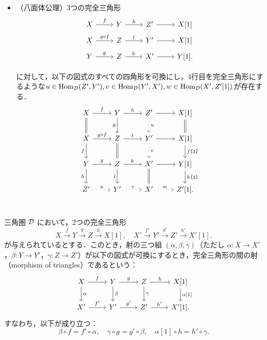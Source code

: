 \begin{defn}
\begin{itemize}
	\item[(TR6)]
		（八面体公理）3つの完全三角形
			\[
				\begin{tikzcd}[row sep=5pt]
			X \ar[r,"f"]& Y\ar[r,"h"]& Z' \ar[r]& X[1]\\
			X \ar[r,"g\circ f"]& Z\ar[r,"l"]& Y' \ar[r]& X[1]\\
			Y \ar[r,"g"]& Z\ar[r,"k"]& X' \ar[r]& Y[1].\\
		\end{tikzcd}
			\]
			に対して，以下の図式のすべての四角形を可換にし，4行目を完全三角形にするような$u\in\operatorname{\mathrm{Hom}}_{{\mathcal D}}(Z',Y'),v\in\operatorname{\mathrm{Hom}}_{{\mathcal D}}(Y',X'),w\in\operatorname{\mathrm{Hom}}_{{\mathcal D}}(X',Z'[1])$が存在する．
			\[
		\begin{tikzcd}
			X \ar[r,"f"]\ar[d,equal]& Y\ar[r,"h"]\ar[d,"g",swap]& Z'\ar[d,"u",dotted] \ar[r]& X[1]\ar[d,equal]\\
			X \ar[r,"g\circ f"]\ar[d,"f",swap]& Z\ar[r,"l"]\ar[d,equal]& Y'\ar[d,"v",dotted] \ar[r]& X[1]\ar[d,"f\texttt{[1]}"]\\
			Y \ar[r,"g"]\ar[d,"h",swap]& Z\ar[r,"k"]\ar[d,"l",swap]& X' \ar[r]\ar[d,equal]& Y[1]\ar[d,"h\texttt{[1]}"]\\
			Z' \ar[r,"u",dotted]& Y'\ar[r,"v",dotted]& X' \ar[r,"w",dotted]& Z'[1].\\
		\end{tikzcd}
			\]
	\end{itemize}
\end{defn}

\begin{defn}\cite[p.243]{KS06}
三角圏 ${\mathcal D}$ において，2つの完全三角形
\[
X \xrightarrow{f} Y \xrightarrow{g} Z \xrightarrow{h} X[1], \quad
X' \xrightarrow{f'} Y' \xrightarrow{g'} Z' \xrightarrow{h'} X'[1].
\]
が与えられているとする．このとき，射の三つ組 $(\alpha, \beta, \gamma)$（ただし $\alpha \colon X \to X'$，$\beta \colon Y \to Y'$，$\gamma \colon Z \to Z'$）が以下の図式が可換にするとき，完全三角形の間の射（morphism of triangles）であるという：
\[
\begin{tikzcd}
X \arrow{r}{f} \arrow{d}{\alpha} & Y \arrow{r}{g} \arrow{d}{\beta} & Z \arrow{r}{h} \arrow{d}{\gamma} & X[1] \arrow{d}{\alpha[1]} \\
X' \arrow{r}{f'} & Y' \arrow{r}{g'} & Z' \arrow{r}{h'} & X'[1].
\end{tikzcd}
\]
すなわち，以下が成り立つ：
\[
\beta \circ f = f' \circ \alpha, \quad
\gamma \circ g = g' \circ \beta, \quad
\alpha[1] \circ h = h' \circ \gamma.
\]
\end{defn}
